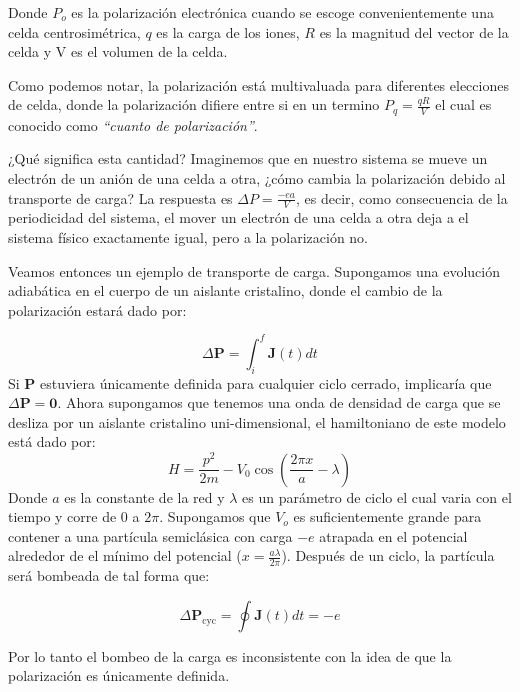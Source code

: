 Donde $P_o$ es la polarización electrónica cuando se escoge convenientemente una celda centrosimétrica, $q$ es la carga de los iones, $R$ es la magnitud del vector de la celda y V es el volumen de la celda.

Como podemos notar, la polarización está multivaluada para diferentes elecciones de celda, donde la polarización difiere entre si en un termino $P_q = \frac{qR}{V}$ el cual es conocido como \textit{``cuanto de polarización''}.

¿Qué significa esta cantidad? Imaginemos que en nuestro sistema se mueve un electrón de un anión de una celda a otra, ¿cómo cambia la polarización debido al transporte de carga? La respuesta es $\Delta P = \frac{-ea}{V}$, es decir, como consecuencia de la periodicidad del sistema, el mover un electrón de una celda a otra deja a el sistema físico exactamente igual, pero a la polarización no.

Veamos entonces un ejemplo de transporte de carga. Supongamos una evolución adiabática en el cuerpo de un aislante cristalino, donde el cambio de la polarización estará dado por:

\begin{equation}
    \Delta \textbf{P} = \int_i^f \textbf{J}(t)dt
\end{equation}
Si \textbf{P} estuviera únicamente definida para cualquier ciclo cerrado, implicaría que  $\Delta \textbf{P} = \textbf{0}$. Ahora supongamos que tenemos una onda de densidad de carga que se desliza por un aislante cristalino uni-dimensional, el hamiltoniano de este modelo está dado por:
\begin{equation}
    H =  \frac{p^2}{2m} - V_0 \cos\left(\frac{2\pi x}{a} - \lambda\right)
\end{equation}
Donde $a$ es la constante de la red y $\lambda$ es un parámetro de ciclo el cual varia con el tiempo y corre de $0$ a $2\pi$. 
Supongamos que $V_o$ es suficientemente grande para contener a una partícula semiclásica con carga $-e$ atrapada en el potencial alrededor de el mínimo del potencial ($x = \frac{a\lambda}{2\pi}$). Después de un ciclo, la partícula será bombeada de tal forma que:

\begin{equation}
    \Delta \textbf{P}_\text{cyc} = \oint \textbf{J}(t)dt = -e
\end{equation}

Por lo tanto el bombeo de la carga es inconsistente con la idea de que la polarización es únicamente  definida. 

